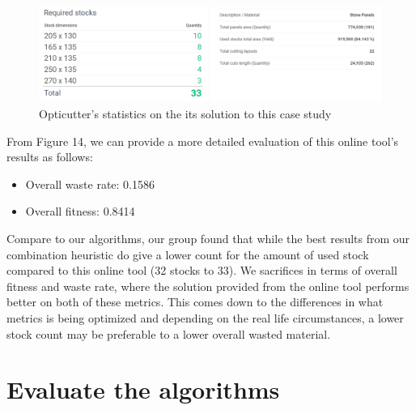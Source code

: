 \documentclass[a4paper]{article}
\begin{document}
    \begin{figure}[h]
        \centering
        \includegraphics[scale = 0.37]{Image/online_tool_result.png}
        \caption{Opticutter's statistics on the its solution to this case study}
    \end{figure}
    \noindent
    From Figure 14, we can provide a more detailed evaluation of this online tool's results as follows:
    \begin{itemize}
        \item Overall waste rate: 0.1586
        \item Overall fitness: 0.8414
    \end{itemize}
    \noindent
    Compare to our algorithms, our group found that while the best results from our combination heuristic do give a lower count for the amount of used stock compared to this online tool (32 stocks to 33). We sacrifices in terms of overall fitness and waste rate, where the solution provided from the online tool performs better on both of these metrics. This comes down to the differences in what metrics is being optimized and depending on the real life circumstances, a lower stock count may be preferable to a lower overall wasted material.
    
    \pagebreak
    \section{Evaluate the algorithms}
\end{document}

